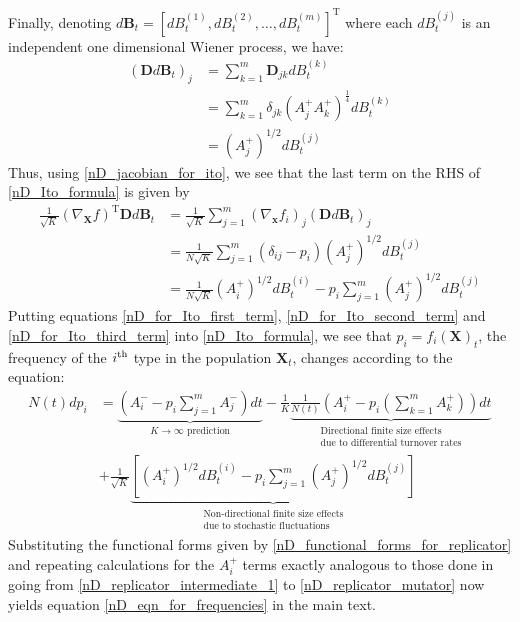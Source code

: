 Finally, denoting $d\mathbf{B}_t = [dB^{(1)}_t,dB^{(2)}_t, \ldots, dB^{(m)}_t]^{\mathrm{T}}$ where each $dB^{(j)}_t$ is an independent one dimensional Wiener process, we have:
\begin{align}
\left(\mathbf{D}d\mathbf{B}_t\right)_j &= \sum\limits_{k=1}^{m}\mathbf{D}_{jk}dB^{(k)}_t\nonumber\\
&= \sum\limits_{k=1}^{m}\delta_{jk}\left(A^{+}_{j}A^{+}_{k}\right)^{\frac{1}{4}}dB^{(k)}_t\\
&= \left(A^{+}_{j}\right)^{1/2}dB^{(j)}_t
\end{align}
Thus, using \eqref{nD_jacobian_for_ito}, we see that the last term on the RHS of \eqref{nD_Ito_formula} is given by
\begin{align}
\frac{1}{\sqrt{K}}\left(\nabla_{\mathbf{X}}f\right)^{\mathrm{T}}\mathbf{D}d\mathbf{B}_t &= \frac{1}{\sqrt{K}}\sum\limits_{j=1}^{m}\left(\nabla_{\mathbf{x}} f_i\right)_j\left(\mathbf{D}d\mathbf{B}_t\right)_j\nonumber\\
&=  \frac{1}{N\sqrt{K}}\sum\limits_{j=1}^{m}\left(\delta_{ij}-p_i\right)\left(A^{+}_{j}\right)^{1/2}dB^{(j)}_t\\
&= \frac{1}{N\sqrt{K}}\left(A^{+}_{i}\right)^{1/2}dB^{(i)}_t - p_i\sum\limits_{j=1}^{m}\left(A^{+}_{j}\right)^{1/2}dB^{(j)}_t\label{nD_for_Ito_third_term}
\end{align}
Putting equations \eqref{nD_for_Ito_first_term}, \eqref{nD_for_Ito_second_term} and \eqref{nD_for_Ito_third_term} into \eqref{nD_Ito_formula}, we see that $p_i = f_i(\mathbf{X})_t$, the frequency of the $i\textsuperscript{th}$ type in the population $\mathbf{X}_t$, changes according to the equation:
\begin{equation}
\begin{aligned}
N(t) dp_i &= \underbrace{\left(A^{-}_{i} - p_i\sum\limits_{j=1}^{m}A^{-}_{j}\right)dt}_{\text{$K \to \infty$ prediction}} - \frac{1}{K}\underbrace{\frac{1}{N(t)}\left(A^{+}_{i}-p_i\left(\sum\limits_{k=1}^{m} A^{+}_k\right)\right)dt}_{\substack{\text{Directional finite size effects}\\\text{due to differential turnover rates}}}\\
&+ \frac{1}{\sqrt{K}}\underbrace{\left[\left(A^{+}_{i}\right)^{1/2}dB^{(i)}_t - p_i\sum\limits_{j=1}^{m}\left(A^{+}_{j}\right)^{1/2}dB^{(j)}_t\right]}_{\substack{\text{Non-directional finite size effects}\\\text{due to stochastic fluctuations}}}
\end{aligned}
\end{equation}
Substituting the functional forms given by \eqref{nD_functional_forms_for_replicator} and repeating calculations for the $A^{+}_i$ terms exactly analogous to those done in going from \eqref{nD_replicator_intermediate_1} to \eqref{nD_replicator_mutator} now yields equation \eqref{nD_eqn_for_frequencies} in the main text.